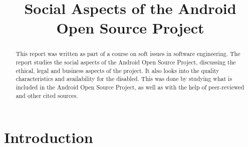 \documentclass[conference]{IEEEtran}
\begin{document}
\title{Social Aspects of the Android Open Source Project}

\author{
{}
}


\maketitle


\begin{abstract}

This report was written as part of a course on soft issues in software engineering. The report studies the social aspects of the Android Open Source Project, discussing the ethical, legal and business aspects of the project. It also looks into the quality characteristics and availability for the disabled. This was done by studying what is included in the Android Open Source Project, as well as with the help of peer-reviewed and other cited sources. 


\end{abstract}


\section{Introduction}
\end{document}
